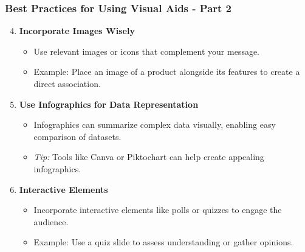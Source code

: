\documentclass[aspectratio=169]{beamer}
\begin{document}
\begin{frame}[fragile]
    \frametitle{Best Practices for Using Visual Aids - Part 2}
    \begin{enumerate}
        \setcounter{enumi}{3}
        \item \textbf{Incorporate Images Wisely}
        \begin{itemize}
            \item Use relevant images or icons that complement your message.
            \item Example: Place an image of a product alongside its features to create a direct association.
        \end{itemize}

        \item \textbf{Use Infographics for Data Representation}
        \begin{itemize}
            \item Infographics can summarize complex data visually, enabling easy comparison of datasets.
            \item \textit{Tip:} Tools like Canva or Piktochart can help create appealing infographics.
        \end{itemize}

        \item \textbf{Interactive Elements}
        \begin{itemize}
            \item Incorporate interactive elements like polls or quizzes to engage the audience.
            \item Example: Use a quiz slide to assess understanding or gather opinions.
        \end{itemize}
    \end{enumerate}
\end{frame}
\end{document}
